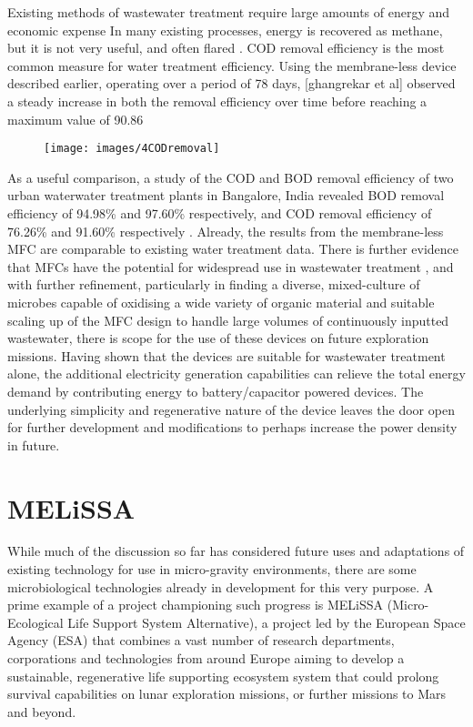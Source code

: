 \documentclass[12pt]{article}
\begin{document}
Existing methods of wastewater treatment require large amounts of energy and economic expense In many existing processes, energy is recovered as methane, but it is not very useful, and often flared \cite{ghangrekar2006wastewater,chang2005improvement}. COD removal efficiency is the most common measure for water treatment efficiency. Using the membrane-less device described earlier, operating over a period of 78 days, [ghangrekar et al] observed a steady increase in both the removal efficiency over time before reaching a maximum value of 90.86%

\begin{figure}[ht]
\centering
\texttt{[image: images/4CODremoval]}
\caption[\cite{ghangrekar2006wastewater} A table displaying BOD and COD removal under varying conditions]{}
\label{fig:4CODremoval}
\end{figure}

As a useful comparison, a study of the COD and BOD removal efficiency of two urban waterwater treatment plants in Bangalore, India revealed BOD removal efficiency of 94.98\% and 97.60\% respectively, and COD removal efficiency of 76.26\% and 91.60\% respectively \cite{pravikumar2010assessment}. Already, the results from the membrane-less MFC are comparable to existing water treatment data. There is further evidence that MFCs have the potential for widespread use in wastewater treatment \cite{fornero2010electric}, and with further refinement, particularly in finding a diverse, mixed-culture of microbes capable of oxidising a wide variety of organic material and suitable scaling up of the MFC design to handle large volumes of continuously inputted wastewater, there is scope for the use of these devices on future exploration missions. Having shown that the devices are suitable for wastewater treatment alone, the additional electricity generation capabilities can relieve the total energy demand by contributing energy to battery/capacitor powered devices. The underlying simplicity and regenerative nature of the device leaves the door open for further development and modifications to perhaps increase the power density in future.

\section{MELiSSA}

While much of the discussion so far has considered future uses and adaptations of existing technology for use in micro-gravity environments, there are some microbiological technologies already in development for this very purpose. A prime example of a project championing such progress is MELiSSA (Micro-Ecological Life Support System Alternative), a project led by the European Space Agency (ESA) that combines a vast number of research departments, corporations and technologies from around Europe aiming to develop a sustainable, regenerative life supporting ecosystem system that could prolong survival capabilities on lunar exploration missions, or further missions to Mars and beyond. \cite{agency2008melissa} 
\end{document}
